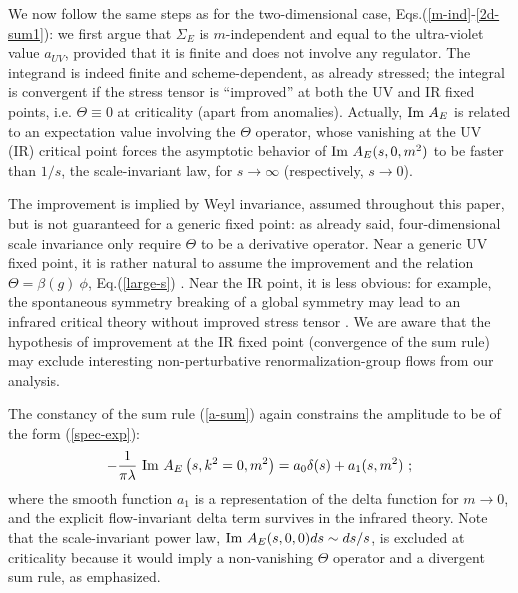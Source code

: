 \documentclass[11pt]{article}
\newcommand{\beq}{\begin{equation}}
\newcommand{\eeq}{\end{equation}}
\def\l{\lambda}
\def\Im{\hbox{\rm Im\ }}
\begin{document}
We now follow the same steps as for the two-dimensional case, 
Eqs.(\ref{m-ind}-\ref{2d-sum1}):
we first argue that $\Sigma_E$ is $m$-independent and equal to the
ultra-violet value $a_{UV}$, provided that it is finite and does not
involve any regulator. 
The integrand is indeed finite and scheme-dependent, as already stressed;
the integral is convergent if the stress tensor is ``improved''
at both the UV and IR fixed points, i.e. $\Theta\equiv 0$ at criticality
(apart from anomalies).
Actually, $\Im A_E$ is related to an expectation value involving
the $\Theta$ operator, whose vanishing at the UV (IR) critical point
forces the asymptotic behavior of $\Im A_E(s,0,m^2)$
to be faster than $1/s$, the scale-invariant law, for $s\to\infty$ 
(respectively, $s\to 0$).
 
The improvement is implied by Weyl invariance, assumed throughout 
this paper, but is not guaranteed for a generic fixed point: as already said,
four-dimensional scale invariance only require $\Theta$ to be
a derivative operator.
Near a generic UV fixed point, it is rather natural to assume the improvement
and the relation $\Theta=\beta(g)\ \phi$,  Eq.(\ref{large-s}) 
\cite{polch}.
Near the IR point, it is less obvious: for example,
the spontaneous symmetry breaking of a global symmetry may
lead to an infrared critical theory without improved stress tensor \cite{cfl}.
We are aware that the hypothesis of improvement at the IR fixed point
(convergence of the sum rule) may exclude interesting 
non-perturbative renormalization-group flows from our analysis.

The constancy of the sum rule (\ref{a-sum}) again constrains the amplitude
to be of the form (\ref{spec-exp}): 
\beq
-\frac{1}{\pi\l}\ \Im A_E \left(s,k^2=0,m^2 \right) =
a_0 \delta(s) + a_1 (s,m^2) \ ;
\label{ae-exp}\eeq
where the smooth function $a_1$ is a
representation of the delta function for $m\to 0$, and the explicit
flow-invariant delta term survives in the infrared theory.
Note that the scale-invariant power law,
$\Im A_E(s,0,0)ds\sim ds/s$, 
is excluded at criticality because it would imply 
a non-vanishing $\Theta$ operator and a divergent sum rule,
as emphasized.
\end{document}
